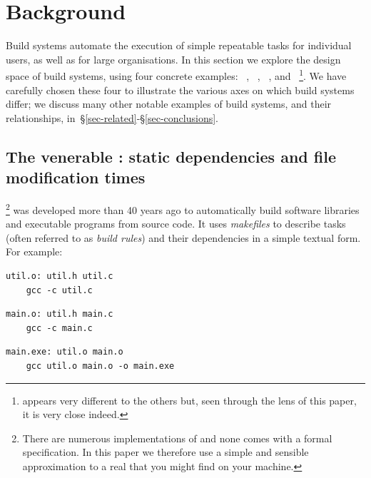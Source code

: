 \clearpage
\section{Background}\label{sec-background}

Build systems automate the execution of simple repeatable tasks for individual
users, as well as for large organisations. In this section we explore the design
space of build systems, using four concrete examples:
\Make~\cite{feldman1979make}, \Shake~\cite{mitchell2012shake},
\Bazel~\cite{bazel}, and \Excel~\cite{advanced_excel}\footnote{\Excel appears
very different to the others but, seen through the lens of this paper, it is
very close indeed.}.
We have carefully chosen these four to illustrate the various axes on which build systems
differ; we discuss many other notable examples
of build systems, and their relationships,
in~\S\ref{sec-related}-\S\ref{sec-conclusions}.

\subsection{The venerable \Make: static dependencies and file modification times}
\label{sec-background-make}

\Make\footnote{There are numerous implementations of \Make and none comes with a
formal specification. In this paper we therefore use a simple and sensible
approximation to a real \Make that you might find on your machine.} was developed
more than 40 years ago to automatically build software libraries and executable
programs from source code. It uses \emph{makefiles} to describe tasks (often
referred to as \emph{build rules}) and their dependencies in a simple textual form.
For example:

\vspace{1mm}
\begin{verbatim}
util.o: util.h util.c
    gcc -c util.c
\end{verbatim}
\vspace{1mm}
\begin{verbatim}
main.o: util.h main.c
    gcc -c main.c
\end{verbatim}
\vspace{1mm}
\begin{verbatim}
main.exe: util.o main.o
    gcc util.o main.o -o main.exe
\end{verbatim}
\vspace{1mm}

